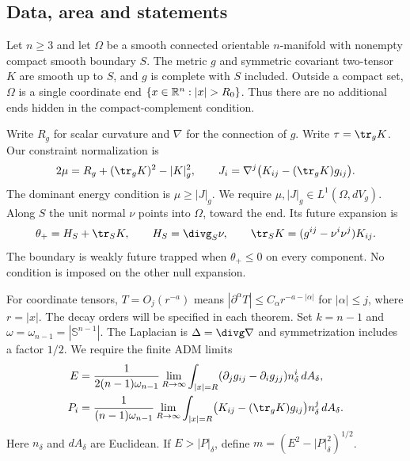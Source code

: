 \subsection{Data, area and statements}
\begin{definition}\label{def:data}
Let $n\geq3$ and let $\Omega$ be a smooth connected orientable
$n$-manifold with nonempty compact smooth boundary $S$. The metric $g$
and symmetric covariant two-tensor $K$ are smooth up to $S$, and $g$ is
complete with $S$ included. Outside a compact set, $\Omega$ is a single
coordinate end $\{x\in\R^n:|x|>R_0\}$. Thus there are no additional
ends hidden in the compact-complement condition.

Write $R_g$ for scalar curvature and $\nabla$ for the connection of $g$.
Write $\tau=\tr_gK$. Our constraint normalization is
\begin{equation}\label{eq:setting:constraints}
 2\mu=R_g+(\tr_gK)^2-|K|_g^2,\qquad
 J_i=\nabla^j\bigl(K_{ij}-(\tr_gK)g_{ij}\bigr).
\end{equation}
The dominant energy condition is $\mu\geq|J|_g$. We require
$\mu,|J|_g\in L^1(\Omega,dV_g)$. Along $S$ the unit normal $\nu$
points into $\Omega$, toward the end. Its future expansion is
\[
 \theta_+=H_S+\tr_SK,\qquad
 H_S=\divg_S\nu,\qquad
 \tr_SK=(g^{ij}-\nu^i\nu^j)K_{ij}.
\]
The boundary is weakly future trapped when $\theta_+\leq0$ on every
component. No condition is imposed on the other null expansion.

For coordinate tensors, $T=O_j(r^{-a})$ means
$|\partial^\alpha T|\leq C_\alpha r^{-a-|\alpha|}$ for
$|\alpha|\leq j$, where $r=|x|$. The decay orders will be specified
in each theorem. Set $k=n-1$ and $\omega=\omega_{n-1}=|\mathbb S^{n-1}|$.
The Laplacian is $\Delta=\divg\nabla$ and symmetrization includes a factor $1/2$. We require the
finite ADM limits
\begin{align}
 E&=\frac{1}{2(n-1)\omega_{n-1}}\lim_{R\to\infty}
  \int_{|x|=R}(\partial_jg_{ij}-\partial_i g_{jj})
       n_\delta^i\,dA_\delta,\label{eq:setting:energy}\\
 P_i&=\frac{1}{(n-1)\omega_{n-1}}\lim_{R\to\infty}
  \int_{|x|=R}\bigl(K_{ij}-(\tr_gK)g_{ij}\bigr)
       n_\delta^j\,dA_\delta.\label{eq:setting:momentum}
\end{align}
Here $n_\delta$ and $dA_\delta$ are Euclidean. If $E>|P|_\delta$, define
$m=(E^2-|P|_\delta^2)^{1/2}$.

\end{definition}

